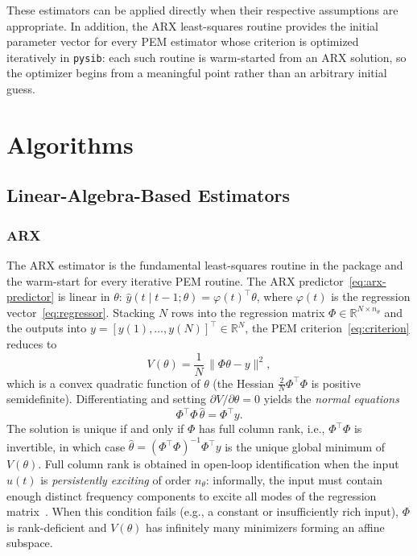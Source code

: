 \documentclass[acmsmall,screen,review]{acmart}
\begin{document}
These estimators can be applied directly when their respective assumptions are
appropriate.  In addition, the ARX least-squares routine provides the initial
parameter vector for every PEM estimator whose criterion is optimized
iteratively in \texttt{pysib}: each such routine is warm-started from an ARX
solution, so the optimizer begins from a meaningful point rather than an
arbitrary initial guess.

\section{Algorithms}
\label{sec:algorithms}

\subsection{Linear-Algebra-Based Estimators}
\label{subsec:linear-estimators}

\subsubsection{ARX}
\label{subsubsec:arx}

The ARX estimator is the fundamental least-squares routine in the package and
the warm-start for every iterative PEM routine.
The ARX predictor~\eqref{eq:arx-predictor} is linear in $\theta$:
$\hat{y}(t \mid t-1;\theta) = \varphi(t)^\top\theta$,
where $\varphi(t)$ is the regression vector~\eqref{eq:regressor}.
Stacking $N$ rows into the regression matrix
$\Phi \in \mathbb{R}^{N \times n_\theta}$ and the outputs into
$y = [y(1),\ldots,y(N)]^\top \in \mathbb{R}^N$,
the PEM criterion~\eqref{eq:criterion} reduces to
\[
    V(\theta) = \frac{1}{N}\,\|\Phi\theta - y\|^2,
\]
which is a convex quadratic function of $\theta$ (the Hessian
$\frac{2}{N}\Phi^\top\Phi$ is positive semidefinite).
Differentiating and setting $\partial V/\partial\theta = 0$ yields the
\emph{normal equations}
\[
    \Phi^\top\Phi\,\hat\theta = \Phi^\top y.
\]
The solution is unique if and only if $\Phi$ has full column rank, i.e.,
$\Phi^\top\Phi$ is invertible, in which case
$\hat\theta = (\Phi^\top\Phi)^{-1}\Phi^\top y$ is the unique global
minimum of $V(\theta)$.  Full column rank is obtained in open-loop identification when the input
$u(t)$ is \emph{persistently exciting} of order $n_\theta$: informally,
the input must contain enough distinct frequency components to excite all
modes of the regression matrix~\cite{ljung1999}.  When this condition
fails (e.g., a constant or insufficiently rich input), $\Phi$ is
rank-deficient and $V(\theta)$ has infinitely many minimizers forming an
affine subspace.
\end{document}
